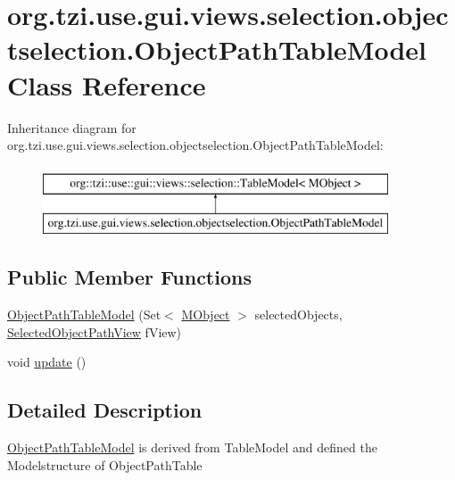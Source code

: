 \hypertarget{classorg_1_1tzi_1_1use_1_1gui_1_1views_1_1selection_1_1objectselection_1_1_object_path_table_model}{\section{org.\-tzi.\-use.\-gui.\-views.\-selection.\-objectselection.\-Object\-Path\-Table\-Model Class Reference}
\label{classorg_1_1tzi_1_1use_1_1gui_1_1views_1_1selection_1_1objectselection_1_1_object_path_table_model}
}
Inheritance diagram for org.\-tzi.\-use.\-gui.\-views.\-selection.\-objectselection.\-Object\-Path\-Table\-Model\-:\begin{figure}[H]
\begin{center}
\leavevmode
\includegraphics[height=2.000000cm]{classorg_1_1tzi_1_1use_1_1gui_1_1views_1_1selection_1_1objectselection_1_1_object_path_table_model}
\end{center}
\end{figure}
\subsection*{Public Member Functions}
\begin{DoxyCompactItemize}
\item 
\hyperlink{classorg_1_1tzi_1_1use_1_1gui_1_1views_1_1selection_1_1objectselection_1_1_object_path_table_model_ac066ff2c075af29eff8d1a18774e1345}{Object\-Path\-Table\-Model} (Set$<$ \hyperlink{interfaceorg_1_1tzi_1_1use_1_1uml_1_1sys_1_1_m_object}{M\-Object} $>$ selected\-Objects, \hyperlink{classorg_1_1tzi_1_1use_1_1gui_1_1views_1_1selection_1_1objectselection_1_1_selected_object_path_view}{Selected\-Object\-Path\-View} f\-View)
\item 
void \hyperlink{classorg_1_1tzi_1_1use_1_1gui_1_1views_1_1selection_1_1objectselection_1_1_object_path_table_model_aca49e68a31cf36228994a2ff7744451e}{update} ()
\end{DoxyCompactItemize}


\subsection{Detailed Description}
\hyperlink{classorg_1_1tzi_1_1use_1_1gui_1_1views_1_1selection_1_1objectselection_1_1_object_path_table_model}{Object\-Path\-Table\-Model} is derived from Table\-Model and defined the Modelstructure of Object\-Path\-Table

